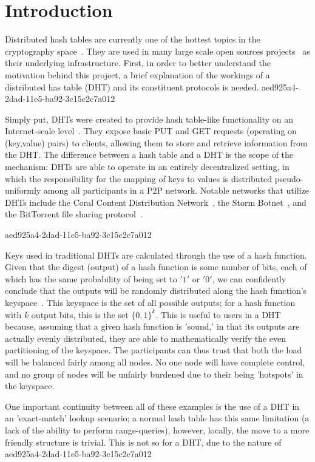 \documentclass[12pt]{article}
\begin{document}
\section{Introduction}
\par Distributed hash tables are currently one of the hottest topics in the cryptography space~\cite{Stoica:2001dj,Rowstron:2001ea,Ratnasamy:2001wn}. They are used in many large scale open sources projects~\cite{Freitas:2013tb,Xu:2010vs,Perfitt:2010fh} as their underlying infrastructure. First, in order to better understand the motivation behind this project, a brief explanation of the workings of a distributed has table (DHT) and its constituent protocols is needed.
aed925a4-2dad-11e5-ba92-3c15c2c7a012
\par Simply put, DHTs were created to provide hash table-like functionality on an Internet-scale level~\cite{Ratnasamy:2001wn}. They expose basic PUT and GET requests (operating on (key,value) pairs) to clients, allowing them to store and retrieve information from the DHT. The difference between a hash table and a DHT is the scope of the mechanism: DHTs are able to operate in an entirely decentralized setting, in which the responsibility for the mapping of keys to values is distributed pseudo-uniformly among all participants in a P2P network. Notable networks that utilize DHTs include the Coral Content Distribution Network~\cite{Freedman:2004vb}, the Storm Botnet~\cite{Holz:2008uk}, and the BitTorrent file sharing protocol~\cite{Cohen:y1_8mBnw}.

aed925a4-2dad-11e5-ba92-3c15c2c7a012\par Keys used in traditional DHTs are calculated through the use of a hash function. Given that the digest (output) of a hash function is some number of bits, each of which has the same probability of being set to $'1'$ or $'0'$, we can confidently conclude that the outputs will be randomly distributed along the hash function's keyspace~. This keyspace is the set of all possible outputs; for a hash function with $k$ output bits, this is the set $\{0,1\}^k$. This is useful to users in a DHT because, assuming that a given hash function is 'sound,' in that its outputs are actually evenly distributed, they are able to mathematically verify the even partitioning of the keyspace. The participants can thus trust that both the load will be balanced fairly among all nodes. No one node will have complete control, and no group of nodes will be unfairly burdened due to their being 'hotspots' in the keyspace.~

\par One important continuity between all of these examples is the use of a DHT in an 'exact-match' lookup scenario; a normal hash table has this same limitation (a lack of the ability to perform range-queries), however, locally, the move to a more friendly structure is trivial. This is not so for a DHT, due to the nature of
\printbibliography
aed925a4-2dad-11e5-ba92-3c15c2c7a012
\end{document}
